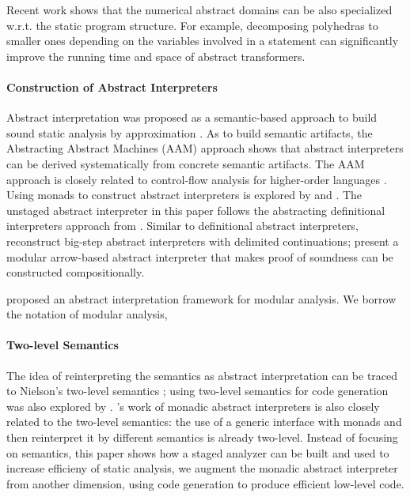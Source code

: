 Recent work shows that the numerical abstract domains can be also specialized
w.r.t. the static program structure. For example, decomposing polyhedras
\cite{DBLP:conf/popl/SinghPV17, Singh:2017:PCD:3177123.3158143} to smaller ones
depending on the variables involved in a statement can significantly improve the
running time and space of abstract transformers.

\paragraph{Construction of Abstract Interpreters} Abstract interpretation was proposed as a
semantic-based approach to build sound static analysis by approximation
\cite{DBLP:conf/popl/CousotC77}. As to build semantic artifacts, the Abstracting
Abstract Machines (AAM) \cite{DBLP:journals/jfp/HornM12, DBLP:conf/icfp/HornM10}
approach shows that abstract interpreters can be derived systematically from concrete
semantic artifacts. The AAM approach is closely related to control-flow analysis
for higher-order languages \cite{Midtgaard:2012:CAF:2187671.2187672}.
Using monads to construct abstract interpreters is explored by
\citet{Sergey:2013:MAI:2491956.2491979} and
\citet{DBLP:journals/pacmpl/DaraisLNH17, Darais:2015:GTM:2814270.2814308}.
The unstaged abstract interpreter in this paper follows the abstracting definitional
interpreters approach from \citet{DBLP:journals/pacmpl/DaraisLNH17}.
Similar to definitional abstract interpreters, \citet{Wei:2018:RAA:3243631.3236800}
reconstruct big-step abstract interpreters with delimited continuations;
\citet{Keidel:2018:CSP:3243631.3236767} present a modular arrow-based abstract
interpreter that makes proof of soundness can be constructed compositionally.

\citet{DBLP:conf/cc/CousotC02} proposed an abstract interpretation framework for
modular analysis. We borrow the notation of modular analysis, 

\paragraph{Two-level Semantics} The idea of reinterpreting the semantics as
abstract interpretation can be traced to Nielson's two-level semantics
\cite{NIELSON1989117}; using two-level semantics for code generation was also
explored by \citet{NIELSON198859}. \citet{Sergey:2013:MAI:2491956.2491979}'s
work of monadic abstract interpreters is also closely related to the two-level
semantics: the use of a generic interface with monads and then reinterpret it by
different semantics is already two-level. Instead of focusing on semantics, this
paper shows how a staged analyzer can be built and used to increase efficieny of
static analysis, we augment the monadic abstract interpreter from another
dimension, using code generation to produce efficient low-level code.

